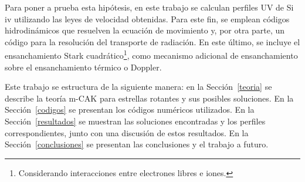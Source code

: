 \documentclass[baaa]{baaa}
\begin{document}
Para poner a prueba esta hipótesis, en este trabajo se calculan perfiles UV de Si {\sc iv} utilizando las leyes de velocidad obtenidas. Para este fin, se emplean c\'odigos hidrodin\'amicos que resuelven la ecuaci\'on de movimiento y, por otra parte, un c\'odigo para la resoluci\'on del transporte de radiaci\'on. En este \'ultimo, se incluye el ensanchamiento Stark cuadr\'atico\footnote{Considerando interacciones entre electrones libres e iones.}, como mecanismo adicional de ensanchamiento sobre el ensanchamiento térmico o Doppler.

Este trabajo se estructura de la siguiente manera: en la Sección~\ref{teoria} se describe la teoría m-CAK para estrellas rotantes y sus posibles soluciones. En la Sección~\ref{codigos} se presentan los códigos num\'ericos utilizados. En la Sección~\ref{resultados} se muestran las soluciones encontradas y los perfiles correspondientes, junto con una discusión de estos resultados. En la Sección~\ref{conclusiones} se presentan las conclusiones y el trabajo a futuro.
\end{document}
